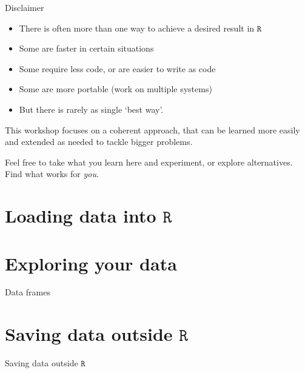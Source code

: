 \documentclass[
  11pt,
  ignorenonframetext,
]{beamer}
\newcommand{\R}{\texttt{R}}
\begin{document}
\begin{frame}{Disclaimer}
\protect\hypertarget{disclaimer}{}
\begin{itemize}
\item
  There is often more than one way to achieve a desired result in \(\R\)
\item
  Some are faster in certain situations
\item
  Some require less code, or are easier to write as code
\item
  Some are more portable (work on multiple systems)
\item
  But there is rarely as single `best way'.
\end{itemize}

This workshop focuses on a coherent approach, that can be learned more
easily and extended as needed to tackle bigger problems.

Feel free to take what you learn here and experiment, or explore
alternatives. Find what works for \emph{you}.
\end{frame}

\hypertarget{loading-data-into-r}{%
\section{\texorpdfstring{Loading data into
\(\R\)}{Loading data into \textbackslash R}}\label{loading-data-into-r}}

\begin{frame}{}
\protect\hypertarget{section}{}
\end{frame}

\hypertarget{exploring-your-data}{%
\section{Exploring your data}\label{exploring-your-data}}

\begin{frame}{Data frames}
\protect\hypertarget{data-frames}{}
\end{frame}

\hypertarget{saving-data-outside-r}{%
\section{\texorpdfstring{Saving data outside
\(\R\)}{Saving data outside \textbackslash R}}\label{saving-data-outside-r}}

\begin{frame}{Saving data outside \(\R\)}
\end{frame}
\end{document}
